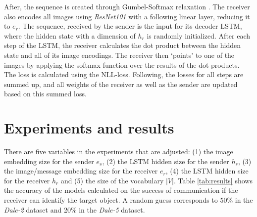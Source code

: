 \documentclass[11pt]{article}
\begin{document}
After, the sequence is created through Gumbel-Softmax relaxation \citep{Jang2016}.
%
The receiver also encodes all images using \emph{ResNet101} with a following linear layer, reducing it to $e_r$.
The sequence, received by the sender is the input for its decoder LSTM, where the hidden state with a dimension of $h_r$ is randomly initialized.
After each step of the LSTM, the receiver calculates the dot product between the hidden state and all of its image encodings.
The receiver then `points' to one of the images by applying the softmax function over the results of the dot products.
The loss is calculated using the NLL-loss.
Following, the losses for all steps are summed up, and all weights of the receiver as well as the sender are updated based on this summed loss.

\section{Experiments and results}

There are five variables in the experiments that are adjusted:
(1) the image embedding size for the sender $e_s$, (2) the LSTM hidden size for the sender $h_s$, (3) the image/message embedding size for the receiver $e_r$, (4) the LSTM hidden size for the receiver $h_r$ and (5) the size of the vocabulary $|V|$.
%
Table \ref{tab:results} shows the accuracy of the models calculated on the success of communication if the receiver can identify the target object.
A random guess corresponds to 50\% in the \emph{Dale-2} dataset and 20\% in the \emph{Dale-5} dataset.


\end{document}
